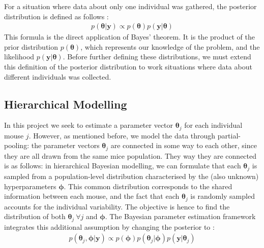 \documentclass[11pt]{article}
\begin{document}
For a situation where data about only one individual was gathered, the posterior distribution is defined as follows \cite{tbk_gelman}:
\begin{align*}
    p(\boldsymbol{\theta} | \boldsymbol{y}) \propto p(\boldsymbol{\theta})p(\boldsymbol{y}|\boldsymbol{\theta})
\end{align*} 
This formula is the direct application of Bayes' theorem. It is the product of the prior distribution $p(\boldsymbol{\theta})$, which represents our knowledge of the problem, and the likelihood $p(\boldsymbol{y} | \boldsymbol{\theta})$. Before further defining these distributions, we must extend this definition of the posterior distribution to work situations where data about different individuals was collected. 

\subsection{Hierarchical Modelling}\label{sec:hierch}

In this project we seek to estimate a parameter vector $\boldsymbol{\theta}_j$ for each individual mouse $j$. However, as mentioned before, we model the data through partial-pooling: the parameter vectors $\boldsymbol{\theta}_j$ are connected in some way to each other, since they are all drawn from the same mice population. They way they are connected is as follows: in hierarchical Bayesian modelling, we can formulate that each $\boldsymbol{\theta}_j$ is sampled from a population-level distribution characterised by the (also unknown) hyperparameters $\boldsymbol{\phi}$. This common distribution corresponds to the shared information between each mouse, and the fact that each $\boldsymbol{\theta}_j$ is randomly sampled accounts for the individual variability. The objective is hence to find the distribution of both $\boldsymbol{\theta}_j~\forall j$ and $\boldsymbol{\phi}$. The Bayesian parameter estimation framework integrates this additional assumption by changing the posterior to \cite{tbk_gelman}:
\begin{align*}
    p(\boldsymbol{\theta}_j, \boldsymbol{\phi} | \boldsymbol{y}) \propto p(\boldsymbol{\phi})p(\boldsymbol{\theta}_j|\boldsymbol{\phi})p(\boldsymbol{y}|\boldsymbol{\theta}_j)
\end{align*} 
\end{document}
